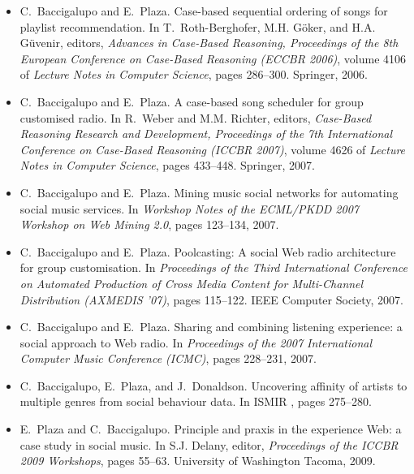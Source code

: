 \begin{itemize}
    \item[] \cite{Baccigalupo06}
    C.~Baccigalupo and E.~Plaza.
    \newblock Case-based sequential ordering of songs for playlist recommendation.
    \newblock In T.~Roth-Berghofer, M.H. G{\"o}ker, and H.A. G{\"u}venir, editors, {\em Advances in {C}ase-{B}ased {R}easoning, Proceedings of the 8th European Conference on Case-Based Reasoning (ECCBR 2006)}, volume 4106 of {\em Lecture Notes in Computer Science}, pages 286--300. Springer, 2006.

      \item[] \cite{Baccigalupo07}
      C.~Baccigalupo and E.~Plaza.
      \newblock A case-based song scheduler for group customised radio.
      \newblock In R.~Weber and M.M. Richter, editors, {\em Case-{B}ased {R}easoning Research and Development, Proceedings of the 7th International Conference on Case-Based Reasoning (ICCBR 2007)}, volume 4626 of {\em Lecture Notes in Computer Science}, pages 433--448. Springer, 2007.

      \item[] \cite{Baccigalupo07c}
      C.~Baccigalupo and E.~Plaza.
      \newblock Mining music social networks for automating social music services.
      \newblock In {\em Workshop Notes of the ECML/PKDD 2007 Workshop on Web Mining 2.0}, pages 123--134, 2007.

      \item[] \cite{Baccigalupo07e}
      C.~Baccigalupo and E.~Plaza.
      \newblock Poolcasting: A social {W}eb radio architecture for group customisation.
      \newblock   In {\em Proceedings of the Third International Conference on Automated Production of Cross Media Content for Multi-Channel Distribution (AXMEDIS '07)}, pages 115--122. IEEE Computer Society, 2007.

      \item[] \cite{Baccigalupo07f}
      C.~Baccigalupo and E.~Plaza.
      \newblock Sharing and combining listening experience: a social approach to {W}eb radio.
      \newblock   In {\em Proceedings of the 2007 International Computer Music Conference (ICMC)}, pages 228--231, 2007.

      \item[] \cite{Baccigalupo08}
      C.~Baccigalupo, E.~Plaza, and J.~Donaldson.
      \newblock Uncovering affinity of artists to multiple genres from social behaviour data.
      \newblock In ISMIR , pages 275--280.

      \item[] \cite{Plaza09}
      E.~Plaza and C.~Baccigalupo.
      \newblock Principle and praxis in the experience {W}eb: a case study in social music.
      \newblock In S.J. Delany, editor, {\em Proceedings of the ICCBR 2009
        Workshops}, pages 55--63. University of Washington Tacoma, 2009.


\end{itemize}


